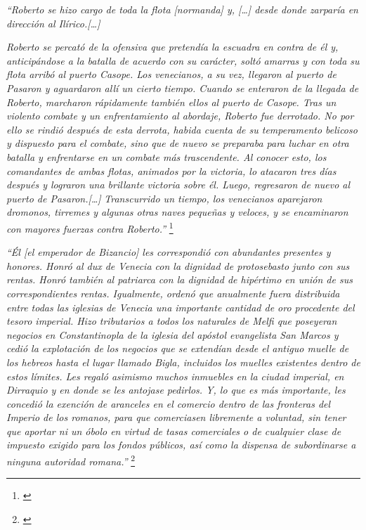 \textit{“Roberto se hizo cargo de toda la flota [normanda] y, 
[…] desde donde zarparía en dirección al Ilírico.[…]}

\textit{Roberto se percató de la ofensiva que pretendía la escuadra 
en contra 
de él y, anticipándose a la batalla de acuerdo con su carácter, soltó 
amarras y con toda su flota arribó al puerto Casope. Los venecianos, 
a su vez, llegaron al puerto de Pasaron y aguardaron allí un cierto 
tiempo. Cuando se enteraron de la llegada de Roberto, marcharon 
rápidamente también ellos al puerto de Casope. Tras un violento 
combate y un enfrentamiento al abordaje, Roberto fue derrotado. 
No por ello se rindió después de esta derrota, habida cuenta de su 
temperamento belicoso y dispuesto para el combate, sino que de nuevo 
se preparaba para luchar en otra batalla y enfrentarse en un 
combate más trascendente. Al conocer esto, los comandantes de ambas 
flotas, animados por la victoria, lo atacaron tres días después y 
lograron una brillante victoria sobre él. Luego, regresaron de 
nuevo al puerto de Pasaron.[…]
}
\textit{Transcurrido un tiempo, los venecianos aparejaron dromonos, 
tirremes y algunas otras naves pequeñas y veloces, y se 
encaminaron con mayores fuerzas contra Roberto.”
}\footnote{\cite[pp.~250--252]{alexiadaVI}}

\textit{“Él [el emperador de Bizancio] les correspondió con 
abundantes presentes y honores.
Honró al dux de Venecia con la dignidad de protosebasto junto con 
sus rentas. Honró también al patriarca con la dignidad de hipértimo en 
unión de sus correspondientes rentas. Igualmente, ordenó que anualmente 
fuera distribuida entre todas las iglesias de Venecia una importante 
cantidad de oro procedente del tesoro imperial. Hizo tributarios a todos los 
naturales de Melfi que poseyeran negocios en Constantinopla de la 
iglesia del apóstol evangelista San Marcos y cedió la explotación de 
los negocios que se extendían desde el antiguo muelle de los hebreos 
hasta el lugar llamado Bigla, incluidos los muelles existentes dentro 
de estos límites. Les regaló asimismo muchos inmuebles en la ciudad 
imperial, en Dirraquio y en donde se les antojase pedirlos. Y, lo que 
es más importante, les concedió la exención de aranceles en el comercio 
dentro de las fronteras del Imperio de los romanos, para que comerciasen 
libremente a voluntad, sin tener que aportar ni un óbolo en virtud de tasas 
comerciales o de cualquier clase de impuesto exigido para los fondos 
públicos, así como la dispensa de subordinarse a ninguna autoridad romana.”
}\footnote{\cite[p.~252]{alexiadaVI}}

